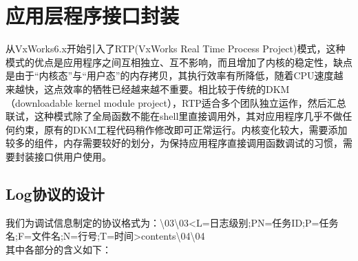 \chapter{应用层程序接口封装}
	从VxWorks6.x开始引入了RTP(VxWorks Real Time Process Project)模式，这种模式的优点是应用程序之间互相独立、互不影响，而且增加了内核的稳定性，缺点是由于“内核态”与“用户态”的内存拷贝，其执行效率有所降低，随着CPU速度越来越快，这点效率的牺牲已经越来越不重要。相比较于传统的DKM（downloadable kernel module project），RTP适合多个团队独立运作，然后汇总联试，这种模式除了全局函数不能在shell里直接调用外，其对应用程序几乎不做任何约束，原有的DKM工程代码稍作修改即可正常运行。内核变化较大，需要添加较多的组件，内存需要较好的划分，为保持应用程序直接调用函数调试的习惯，需要封装接口供用户使用。

\section{Log协议的设计}

我们为调试信息制定的协议格式为：\backslash 03\backslash 03<L=日志级别;PN=任务ID;P=任务名;F=文件名;N=行号;T=时间>contents\backslash 04\backslash 04\\
其中各部分的含义如下：

